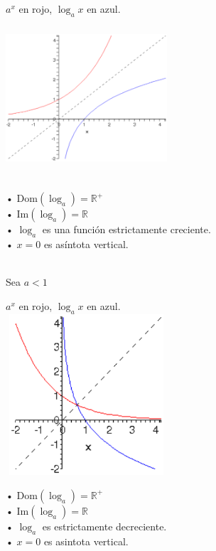 \hfill
\begin{minipage}{.45\textwidth}
$a^x$ en rojo, $\log _a x$ en azul.\\
\includegraphics[height=6cm,width=6cm]{loga1.eps}

\end{minipage}
\hfill
\begin{minipage}{.45\textwidth}

• Dom$(\log _a) = \mathbb{R} ^+$ \\

• Im$(\log _a)= \mathbb{R}$\\

• $\log _a$ es una función estrictamente creciente.\\

• $x=0$ es asíntota vertical.

\end{minipage}
\hfill \\

Sea $a<1$\\

\hfill
\begin{minipage}{.45\textwidth}
$a^x$ en rojo, $\log _a x$ en azul.\\
\includegraphics[height=6cm,width=6cm]{loga2.eps}
\end{minipage}
\hfill
\begin{minipage}{.45\textwidth}

• Dom$(\log _a) = \mathbb{R} ^+$ \\

• Im$(\log _a)= \mathbb{R}$\\

• $\log _a$ es  estrictamente decreciente.\\

• $x=0$ es asintota vertical.

\end{minipage}
\hfill \\

